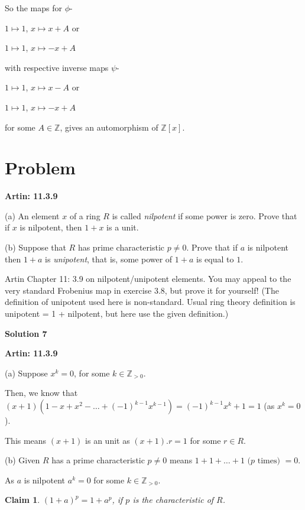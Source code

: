 \documentclass[12pt,a4paper]{article}
\newtheorem{claim}[theorem]{Claim}
\theoremstyle{definition}
\begin{document}
\begin{flushleft}
So the maps for $\phi$-

$1 \mapsto 1$, $x \mapsto x + A$ or

$1 \mapsto 1$, $x \mapsto -x + A$

with respective inverse maps $\psi$-

$1 \mapsto 1$, $x \mapsto x - A$ or

$1 \mapsto 1$, $x \mapsto -x + A$

for some $A \in \mathbb{Z}$, gives an automorphism of $\mathbb{Z}[x]$.

\newpage

\setcounter{section}{6}
\section{Problem}

{\bf Artin: 11.3.9}

(a) An element $x$ of a ring $R$ is called {\it nilpotent} if some power is zero. Prove that if $x$ is nilpotent, then $1 + x$ is a unit.

(b) Suppose that $R$ has prime characteristic $p \ne 0$. Prove that if $a$ is nilpotent then $1 + a$ is {\it unipotent}, that is, some power of $1+ a$ is equal to $1$.

\medskip

Artin Chapter 11: 3.9 on nilpotent/unipotent elements. You may appeal to the very standard Frobenius map in exercise 3.8, but prove it for yourself! (The definition of unipotent used here is non-standard. Usual ring theory definition is unipotent = 1 + nilpotent, but here use the given definition.)

\bigskip

{\bf Solution 7}

\medskip

{\bf Artin: 11.3.9}

(a) Suppose $x^k = 0$, for some $k \in \mathbb{Z}_{>0}$.

Then, we know that $(x+1)(1 - x + x^2 - \dots + (-1)^{k-1}x^{k-1}) = (-1)^{k-1}x^k + 1 = 1$ (as $x^k = 0$).

This means $(x+1)$ is an unit as $(x+1).r = 1$ for some $r \in R$.

\medskip

(b) Given $R$ has a prime characteristic $p \ne 0$ means $1 + 1 + \dots +1 \text{ ($p$ times) } =0$.

As $a$ is nilpotent $a^k = 0$ for some $k \in \mathbb{Z}_{>0}$.

\begin{claim}
	$(1 +a)^p = 1 + a^p$, if $p$ is the characteristic of $R$.
\end{claim}


\end{flushleft}
\end{document}
